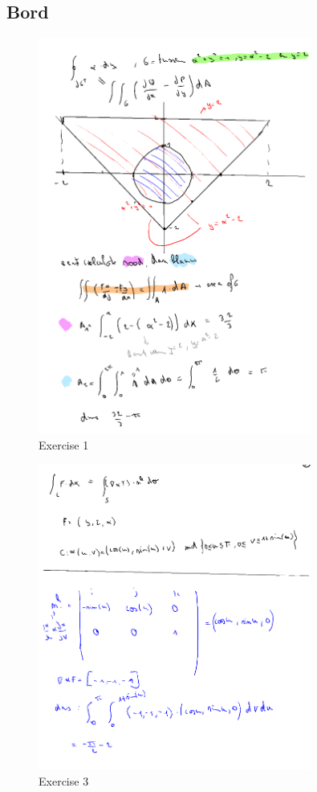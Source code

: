 \documentclass[a4paper]{report}
\begin{document}
\subsection{Bord}

\begin{figure}[H]
	\centering
	\includegraphics[width=0.8\textwidth]{assets/bord_7_ex_1_echt.png}
	\caption{Exercise 1}
	\label{fig:bord_7_ex_1_echt}
\end{figure}

\begin{figure}[H]
	\centering
	\includegraphics[width=0.8\textwidth]{assets/bord_7_ex_1.png}
	\caption{Exercise 3}
	\label{fig:bord_7_ex_3}
\end{figure}
\end{document}
